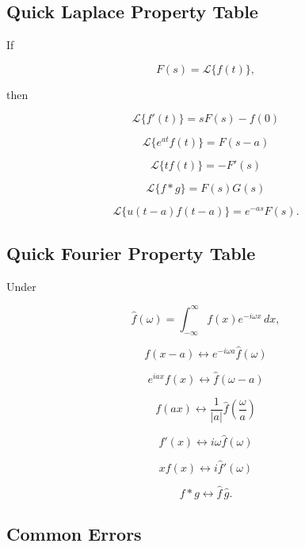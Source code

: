 \subsection{Quick Laplace Property Table}
\label{subsec:quick-laplace-properties}

If

\[
F(s)=\mathcal{L}\{f(t)\},
\]

then

\[
\boxed{
\mathcal{L}\{f'(t)\}
=
sF(s)-f(0)
}
\]

\[
\boxed{
\mathcal{L}\{e^{at}f(t)\}
=
F(s-a)
}
\]

\[
\boxed{
\mathcal{L}\{t f(t)\}
=
-F'(s)
}
\]

\[
\boxed{
\mathcal{L}\{f*g\}
=
F(s)G(s)
}
\]

\[
\boxed{
\mathcal{L}
\{
u(t-a)f(t-a)
\}
=
e^{-as}F(s).
}
\]

\subsection{Quick Fourier Property Table}
\label{subsec:quick-fourier-properties}

Under

\[
\widehat f(\omega)
=
\int_{-\infty}^{\infty}
f(x)e^{-i\omega x}\,dx,
\]

\[
\boxed{
f(x-a)
\longleftrightarrow
e^{-i\omega a}\widehat f(\omega)
}
\]

\[
\boxed{
e^{iax}f(x)
\longleftrightarrow
\widehat f(\omega-a)
}
\]

\[
\boxed{
f(ax)
\longleftrightarrow
\frac1{|a|}
\widehat f\left(\frac{\omega}{a}\right)
}
\]

\[
\boxed{
f'(x)
\longleftrightarrow
i\omega\widehat f(\omega)
}
\]

\[
\boxed{
xf(x)
\longleftrightarrow
i\widehat f'(\omega)
}
\]

\[
\boxed{
f*g
\longleftrightarrow
\widehat f\,\widehat g.
}
\]

\subsection{Common Errors}
\label{subsec:transform-tables-common-errors}

